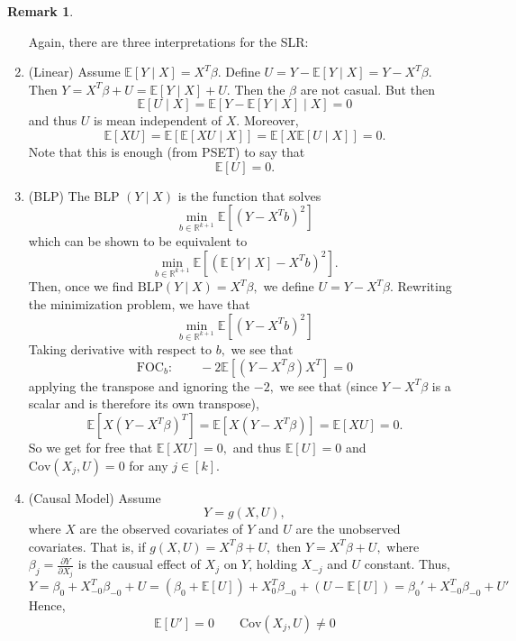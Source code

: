 \documentclass[10pt, oneside]{article}
\newcommand{\bbR}{\mathbb{R}}
\newcommand{\Cov}{\text{Cov}}
\newcommand{\bbE}{\mathbb{E}}
\theoremstyle{definition}
\newtheorem{rem}{Remark}
\begin{document}
\begin{rem}
    \begin{enumerate}
    Again, there are three interpretations for the SLR:
        \item (Linear) Assume $\bbE[Y \mid X] = X^T \beta.$ Define $U = Y - \bbE[Y \mid X] = Y - X^T \beta.$ Then $Y = X^T \beta + U = \bbE[Y \mid X] + U$. Then the $\beta$ are not casual. But then 
        \[\bbE[U \mid X] = \bbE[Y - \bbE[Y \mid X] \mid X] = 0\] and thus $U$ is mean independent of $X.$ Moreover, 
        \[\bbE[X U] = \bbE[\bbE[XU \mid X]] = \bbE[X \bbE[U \mid X]] = 0.\] Note that this is enough (from PSET) to say that 
        \[\bbE[U] = 0.\]
        \item (BLP) The BLP $(Y \mid X)$ is the function that solves 
        \[\min_{b\in \bbR^{k+1}}\bbE[(Y - X^T b)^2]\] which can be shown to be equivalent to 
        \[\min_{b\in \bbR^{k+1}}\bbE[(\bbE[Y \mid X] - X^T b)^2].\] Then, once we find $\text{BLP}(Y \mid X) = X^T\beta,$ we define $U = Y - X^T\beta.$ Rewriting the minimization problem, we have that 
        \[\min_{b \in \bbR^{k+1}} \bbE[(Y - X^T b)^2]\] Taking derivative with respect to $b,$ we see that 
        \[\text{FOC}_b: \qquad -2\bbE[(Y- X^T \beta)X^T] = 0\] applying the transpose and ignoring the $-2,$ we see that (since $Y - X^T\beta$ is a scalar and is therefore its own transpose),
        \[\bbE[X(Y - X^T \beta)^T] = \bbE[X(Y - X^T \beta)] = \bbE[XU]= 0.\] So we get for free that $\bbE[XU] = 0,$ and thus $\bbE[U] = 0$ and $\Cov(X_j,U) = 0$ for any $j \in [k]$.
        \item (Causal Model) Assume 
        \[Y = g(X, U),\] where $X$ are the observed covariates of $Y$ and $U$ are the unobserved covariates. That is, if $g(X,U) = X^T\beta + U,$ then $Y = X^T\beta + U,$ where $\beta_j = \frac{\partial Y}{\partial X_j}$ is the causual effect of $X_j$ on $Y$, holding $X_{-j}$ and $U$ constant. Thus, 
        \[Y = \beta_0 + X_{-0}^T\beta_{-0}+ U = (\beta_0 + \bbE[U]) + X_0^T\beta_{-0} + (U - \bbE[U]) = \beta_0' + X_{-0}^T \beta_{-0} + U'\] Hence, 
        \[\bbE[U'] = 0 \qquad \Cov(X_j, U) \neq 0\]
    \end{enumerate}
\end{rem}


\newpage
\end{document}
